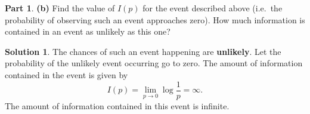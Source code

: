 \documentclass[11pt]{article}
\theoremstyle{definition}
\newtheorem{question}{Part}[section]
\newtheorem*{solution}{Solution}
\numberwithin{equation}{section}
\numberwithin{figure}{section}
\begin{document}
\begin{question}
\textbf{(b)} Find the value of $I(p)$ for the event described above (i.e.~the probability of observing such an event approaches zero). How much information is contained in an event as unlikely as this one?
\end{question}

\begin{solution}
The chances of such an event happening are \textbf{unlikely}. Let the probability of the unlikely event occurring go to zero. The amount of information contained in the event is given by
\begin{equation}
\boxed{I(p) = \lim_{p \to 0}  \log\frac{1}{p} = \infty.}
\end{equation}
The amount of information contained in this event is infinite.
\end{solution}
\end{document}
